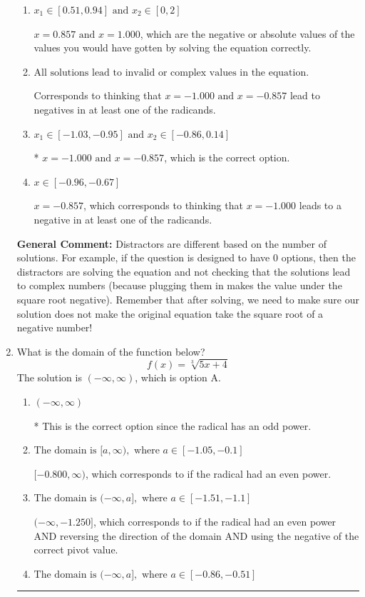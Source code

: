 \documentclass{extbook}[14pt]
\newcommand{\litem}[1]{\item #1

\rule{\textwidth}{0.4pt}}
\begin{document}
\begin{enumerate}
{\begin{enumerate}[label=\Alph*.]
$x = -1.000$, which corresponds to thinking that $x = -0.857$ leads to a negative in at least one of the radicands.
\item \( x_1 \in [0.51, 0.94] \text{ and } x_2 \in [0,2] \)

$x = 0.857 \text{ and } x = 1.000$, which are the negative or absolute values of the values you would have gotten by solving the equation correctly.
\item \( \text{All solutions lead to invalid or complex values in the equation.} \)

Corresponds to thinking that $x = -1.000 \text{ and } x = -0.857$ lead to negatives in at least one of the radicands.
\item \( x_1 \in [-1.03, -0.95] \text{ and } x_2 \in [-0.86,0.14] \)

* $x = -1.000 \text{ and } x = -0.857$, which is the correct option.
\item \( x \in [-0.96,-0.67] \)

$x = -0.857$, which corresponds to thinking that $x = -1.000$ leads to a negative in at least one of the radicands.
\end{enumerate}

\textbf{General Comment:} Distractors are different based on the number of solutions. For example, if the question is designed to have 0 options, then the distractors are solving the equation and not checking that the solutions lead to complex numbers (because plugging them in makes the value under the square root negative). Remember that after solving, we need to make sure our solution does not make the original equation take the square root of a negative number!
}
\litem{
What is the domain of the function below?
\[ f(x) = \sqrt[3]{5 x + 4} \]The solution is \( (-\infty, \infty) \), which is option A.\begin{enumerate}[label=\Alph*.]
\item \( (-\infty, \infty) \)

* This is the correct option since the radical has an odd power.
\item \( \text{The domain is } [a, \infty), \text{   where } a \in [-1.05, -0.1] \)

$[-0.800, \infty)$, which corresponds to if the radical had an even power.
\item \( \text{The domain is } (-\infty, a], \text{   where } a \in [-1.51, -1.1] \)

$(-\infty, -1.250]$, which corresponds to if the radical had an even power AND reversing the direction of the domain AND using the negative of the correct pivot value.
\item \( \text{The domain is } (-\infty, a], \text{   where } a \in [-0.86, -0.51] \)


\end{enumerate}}
\end{enumerate}
\end{document}
